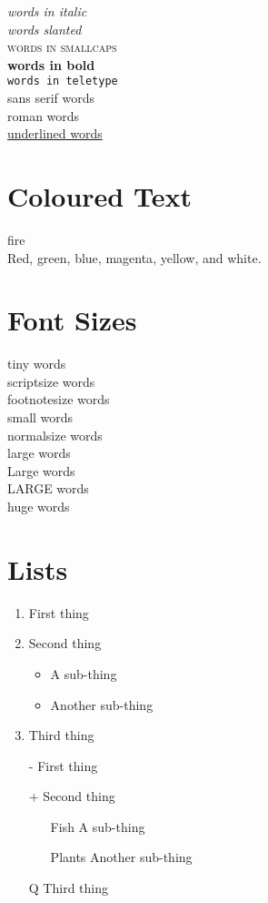 \documentclass[a4paper, 12pt]{report}
\begin{document}
\textit{words in italic}\\
\textsl{words slanted}\\
\textsc{words in smallcaps}\\
\textbf{words in bold}\\
\texttt{words in teletype}\\
\textsf{sans serif words}\\
\textrm{roman words}\\
\underline{underlined words}

\section{Coloured Text}

{\color{red}fire} \\
{\color{red}Red}, {\color{green}green}, {\color{blue}blue}, {\color{magenta}magenta}, {\color{yellow}yellow}, and {\color{white}white}.

\section{Font Sizes}

{\tiny tiny words}\\
{\scriptsize scriptsize words}\\
{\footnotesize footnotesize words}\\
{\small small words}\\
{\normalsize normalsize words}\\
{\large large words}\\
{\Large Large words}\\
{\LARGE LARGE words}\\
{\huge huge words}


\section{Lists}

\begin{enumerate}
\item First thing
\item Second thing
\begin{itemize}
\item A sub-thing
\item Another sub-thing
\end{itemize}
\item Third thing
\end{enumerate}


\begin{itemize}
\item[-] First thing
\item[+] Second thing
\begin{itemize}
\item[Fish] A sub-thing
\item[Plants] Another sub-thing
\end{itemize}
\item[Q] Third thing
\end{itemize}
\end{document}
